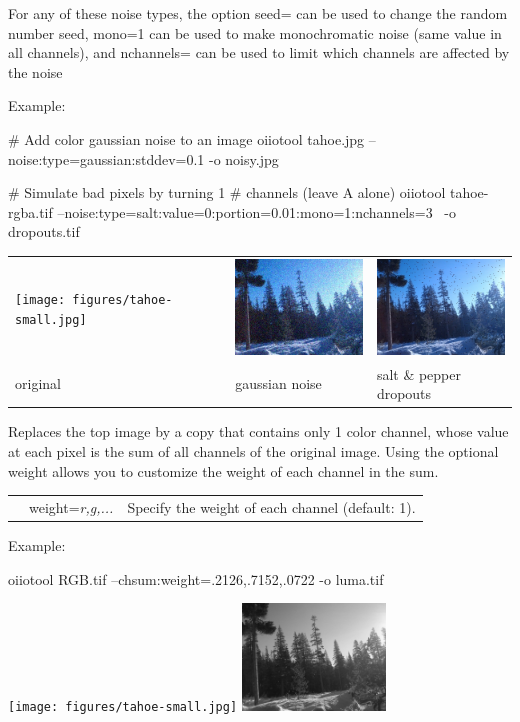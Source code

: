 For any of these noise types, the option {\cf seed=} can be used to change
the random number seed, {\cf mono=1} can be used to make monochromatic noise
(same value in all channels), and {\cf nchannels=} can be used to limit
which channels are affected by the noise

\noindent Example:
\begin{code}
    # Add color gaussian noise to an image
    oiiotool tahoe.jpg --noise:type=gaussian:stddev=0.1 -o noisy.jpg

    # Simulate bad pixels by turning 1%
    # channels (leave A alone)
    oiiotool tahoe-rgba.tif --noise:type=salt:value=0:portion=0.01:mono=1:nchannels=3 \
        -o dropouts.tif
\end{code}

\spc \begin{tabular}{lll}
\texttt{[image: figures/tahoe-small.jpg]} &
\includegraphics[width=1.5in]{figures/tahoe-gauss.jpg} &
\includegraphics[width=1.5in]{figures/tahoe-pepper.jpg} \\
original & gaussian noise & salt \& pepper dropouts \\
\end{tabular}
\apiend

Replaces the top image by a copy that contains only 1 color channel,
whose value at each pixel is the sum of all channels of the original
image.  Using the optional {\cf weight} allows you to customize the
weight of each channel in the sum.

\begin{tabular}{p{10pt} p{1in} p{3.5in}}
  & {\cf weight=}\emph{r,g,...} & Specify the weight of each channel
  (default: 1).
\end{tabular}

\noindent Example:
\begin{code}
    oiiotool RGB.tif --chsum:weight=.2126,.7152,.0722 -o luma.tif
\end{code}
\spc \texttt{[image: figures/tahoe-small.jpg]}
\raisebox{40pt}{\large $\rightarrow$}
\includegraphics[width=1.5in]{figures/luma.jpg} \\
\apiend

